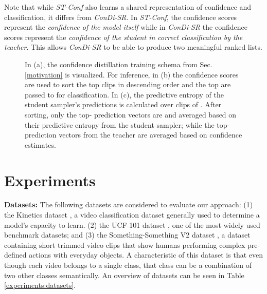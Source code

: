 \documentclass[a4paper,conference]{IEEEtran}
\begin{document}
Note that while \textit{ST-Conf} also learns a shared representation of confidence and classification, it differs from \textit{ConDi-SR}. In \textit{ST-Conf}, the confidence scores represent the \textit{confidence of the model itself} while in \textit{ConDi-SR} the confidence scores represent the \textit{confidence of the student in correct classification by the teacher}. This allows \textit{ConDi-SR} to be able to produce two meaningful ranked lists. 

\begin{figure*} \centering
    \quad
    \vrule
    \quad
    \qquad
    \caption{In (a), the confidence distillation training schema from Sec. \ref{motivation} is visualized. For inference, in (b) the confidence scores  are used to sort the top  clips in descending order and the top  are passed to  for classification. In (c), the predictive entropy of the student sampler's predictions is calculated over clips of . After sorting, only the top- prediction vectors are and averaged based on their predictive entropy from the student sampler; while the top- prediction vectors from the teacher are averaged based on confidence estimates.}\label{fig:inference}
\end{figure*}


\section{Experiments}

{\bf Datasets:} The following datasets are considered to evaluate our approach: (1) the Kinetics dataset \cite{kay2017kinetics, carreira2018short, carreira2019short}, a video classification dataset generally used to determine a model's capacity to learn. (2) the UCF-101 dataset \cite{soomro2012ucf101}, one of the most widely used benchmark datasets; and (3) the Something-Something V2 dataset \cite{goyal2017something}, a dataset containing short trimmed video clips that show humans performing complex pre-defined actions with everyday objects. A characteristic of this dataset is that even though each video belongs to a single class, that class can be a combination of two other classes semantically. An overview of datasets can be seen in Table \ref{experiments:datasets}.
\end{document}
